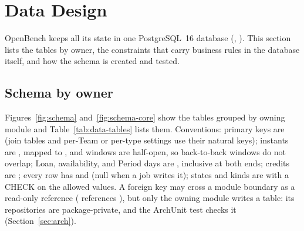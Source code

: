 \begingroup\setlength{\emergencystretch}{2em}
\section{Data Design}\label{sec:data}

OpenBench keeps all its state in one PostgreSQL~16 database (, ). This section lists the tables by owner, the constraints that carry business rules in the database itself, and how the schema is created and tested.

\subsection{Schema by owner}

Figures~\ref{fig:schema} and~\ref{fig:schema-core} show the tables grouped by owning module and Table~\ref{tab:data-tables} lists them. Conventions: primary keys are  (join tables and per-Team or per-type settings use their natural keys); instants are , mapped to , and windows are half-open, so back-to-back windows do not overlap; Loan, availability, and Period days are , inclusive at both ends; credits are ; every row has  and  (null when a job writes it); states and kinds are  with a CHECK on the allowed values. A foreign key may cross a module boundary as a read-only reference ( references ), but only the owning module writes a table: its repositories are package-private, and the ArchUnit test checks it (Section~\ref{sec:arch}).

